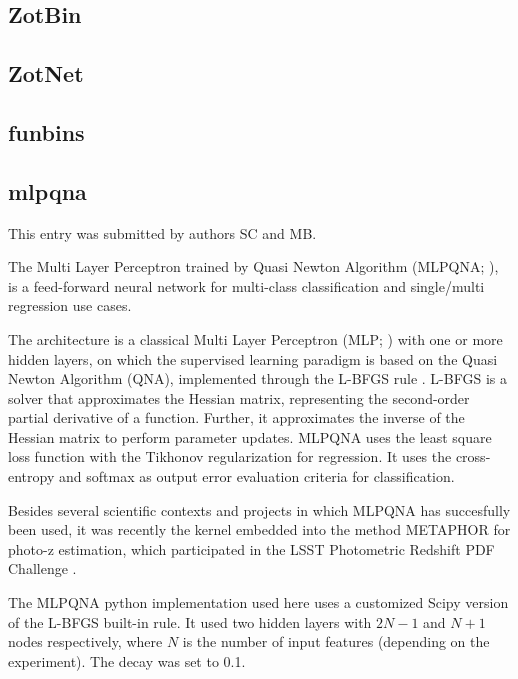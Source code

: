 \documentclass[twocolumn,twocolappendix]{aastex63}
\begin{document}
\subsection{ {\sc ZotBin} }


\subsection{ {\sc ZotNet} }


\subsection{ {\sc funbins} }


\subsection{ {\sc mlpqna} }
This entry was submitted by authors SC and MB.

The Multi Layer Perceptron trained by Quasi Newton Algorithm 
({\sc MLPQNA}; \citealp{Brescia12}), is a feed-forward neural network 
for multi-class classification and single/multi regression use cases.

The architecture is a classical Multi Layer Perceptron (MLP; \citealp{Rosenblatt1961})
with one or more hidden layers, on which the supervised learning paradigm is
based on the Quasi Newton Algorithm (QNA), implemented through the L-BFGS rule
\citep{Nocedal80}. L-BFGS is a solver that approximates the Hessian matrix,
representing the second-order partial derivative of a function. Further, it
approximates the inverse of the Hessian matrix to perform parameter updates.
MLPQNA uses the least square loss function with the Tikhonov regularization
\citep{Tikhonov77} for regression. It uses the cross-entropy \citep{deBoer05}
and softmax \citep{Sutton98} as output error evaluation criteria for
classification.

Besides several scientific contexts and projects in which MLPQNA has succesfully
been used, it was recently the kernel embedded into the method {\sc
METAPHOR} \citep{cavuoti20} for photo-z estimation, which participated in the
LSST Photometric Redshift PDF Challenge \citep{schmidt20}. 

The {\sc MLPQNA} python implementation used here
uses a customized Scipy version of the L-BFGS built-in rule.
It used two hidden layers with $2N-1$ and $N+1$ nodes respectively,
where $N$ is the number of input features (depending on the experiment).
The decay was set to 0.1.
\end{document}
